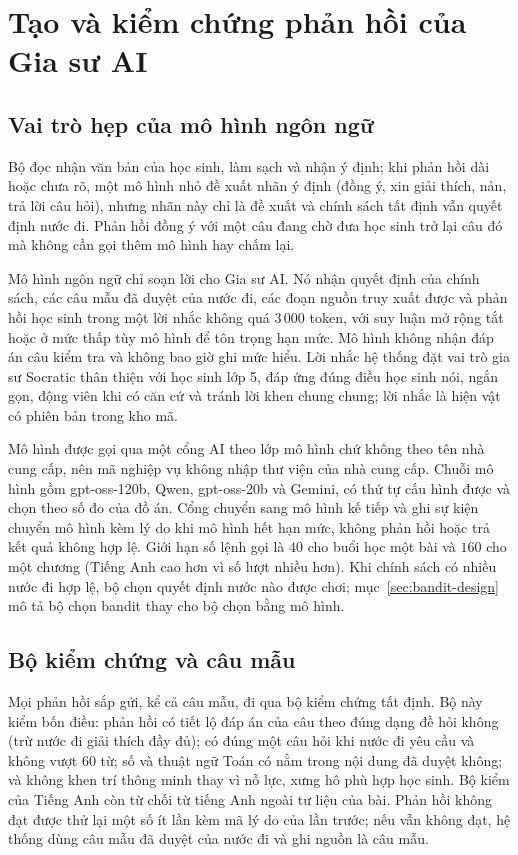 \section{Tạo và kiểm chứng phản hồi của Gia sư AI}\label{sec:render-design}

\subsection{Vai trò hẹp của mô hình ngôn ngữ}
Bộ đọc nhận văn bản của học sinh, làm sạch và nhận ý định; khi phản hồi dài hoặc chưa rõ, một mô hình nhỏ đề xuất nhãn ý định (đồng ý, xin giải thích, nản, trả lời câu hỏi), nhưng nhãn này chỉ là đề xuất và chính sách tất định vẫn quyết định nước đi. Phản hồi đồng ý với một câu đang chờ đưa học sinh trở lại câu đó mà không cần gọi thêm mô hình hay chấm lại.

Mô hình ngôn ngữ chỉ soạn lời cho Gia sư AI. Nó nhận quyết định của chính sách, các câu mẫu đã duyệt của nước đi, các đoạn nguồn truy xuất được và phản hồi học sinh trong một lời nhắc không quá $3\,000$ token, với suy luận mở rộng tắt hoặc ở mức thấp tùy mô hình để tôn trọng hạn mức. Mô hình không nhận đáp án câu kiểm tra và không bao giờ ghi mức hiểu. Lời nhắc hệ thống đặt vai trò gia sư Socratic thân thiện với học sinh lớp 5, đáp ứng đúng điều học sinh nói, ngắn gọn, động viên khi có căn cứ và tránh lời khen chung chung; lời nhắc là hiện vật có phiên bản trong kho mã.

Mô hình được gọi qua một cổng AI theo lớp mô hình chứ không theo tên nhà cung cấp, nên mã nghiệp vụ không nhập thư viện của nhà cung cấp. Chuỗi mô hình gồm gpt-oss-120b, Qwen, gpt-oss-20b và Gemini, có thứ tự cấu hình được và chọn theo số đo của đồ án. Cổng chuyển sang mô hình kế tiếp và ghi sự kiện chuyển mô hình kèm lý do khi mô hình hết hạn mức, không phản hồi hoặc trả kết quả không hợp lệ. Giới hạn số lệnh gọi là $40$ cho buổi học một bài và $160$ cho một chương (Tiếng Anh cao hơn vì số lượt nhiều hơn). Khi chính sách có nhiều nước đi hợp lệ, bộ chọn quyết định nước nào được chơi; mục~\ref{sec:bandit-design} mô tả bộ chọn bandit thay cho bộ chọn bằng mô hình.

\subsection{Bộ kiểm chứng và câu mẫu}
Mọi phản hồi sắp gửi, kể cả câu mẫu, đi qua bộ kiểm chứng tất định. Bộ này kiểm bốn điều: phản hồi có tiết lộ đáp án của câu theo đúng dạng đề hỏi không (trừ nước đi giải thích đầy đủ); có đúng một câu hỏi khi nước đi yêu cầu và không vượt $60$ từ; số và thuật ngữ Toán có nằm trong nội dung đã duyệt không; và không khen trí thông minh thay vì nỗ lực, xưng hô phù hợp học sinh. Bộ kiểm của Tiếng Anh còn từ chối từ tiếng Anh ngoài tư liệu của bài. Phản hồi không đạt được thử lại một số ít lần kèm mã lý do của lần trước; nếu vẫn không đạt, hệ thống dùng câu mẫu đã duyệt của nước đi và ghi nguồn là câu mẫu.

